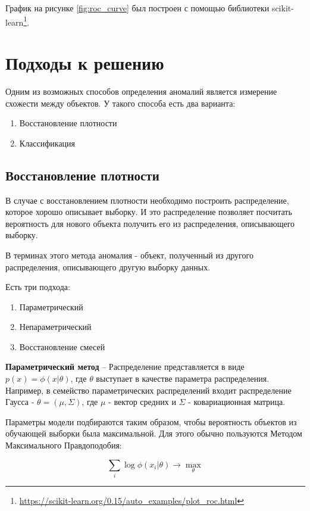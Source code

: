 График на рисунке \ref{fig:roc_curve} был построен с помощью библиотеки scikit-learn\footnote{\url{https://scikit-learn.org/0.15/auto_examples/plot_roc.html}}.

\clearpage

\section{Подходы к решению} \label{sec:ch2/sec3}

Одним из возможных способов определения аномалий является измерение схожести между объектов. У такого способа есть два варианта:
\begin{enumerate}
  \item Восстановление плотности
  \item Классификация
\end{enumerate}

\subsection{Восстановление плотности}

В случае с восстановлением плотности необходимо построить распределение, которое хорошо описывает выборку. И это распределение позволяет посчитать вероятность для нового объекта получить его из распределения, описывающего выборку.

В терминах этого метода аномалия - объект, полученный из другого распределения, описывающего другую выборку данных.

\noindent Есть три подхода:
\begin{enumerate}
  \item Параметрический
  \item Непараметрический
  \item Восстановление смесей
\end{enumerate}

\noindent\textbf{Параметрический метод} -- Распределение представляется в виде $p(x)=\phi(x\vert\theta)$, где $\theta$ выступает в качестве параметра распределения. Например, в семейство параметрических распределений входит распределение Гаусса - $\theta=(\mu, \Sigma)$, где $\mu$ - вектор средних и $\Sigma$ - ковариационная матрица.

Параметры модели подбираются таким образом, чтобы вероятность объектов из обучающей выборки была максимальной. Для этого обычно пользуются Методом Максимального Правдоподобия:

\[ \sum_{i}\log\phi(x_{i}\vert\theta) \rightarrow \max_{\theta} \]

